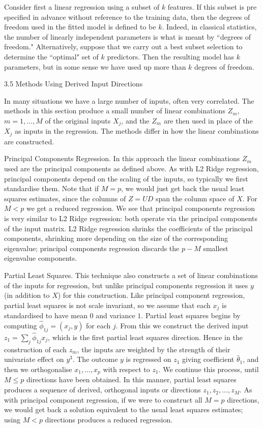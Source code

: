 Consider first a linear regression using a subset of $k$ features. If this subset is pre specified in advance without reference to the training data, then the degrees of freedom used in the fitted model is defined to be $k$. Indeed, in classical statistics, the number of linearly independent parameters is what is meant by ``degrees of freedom." Alternatively, suppose that we carry out a best subset selection to determine the ``optimal" set of $k$ predictors. Then the resulting model has $k$ parameters, but in some sense we have used up more than $k$ degrees of freedom.

3.5 Methods Using Derived Input Directions

In many situations we have a large number of inputs, often very correlated. The methods in this section produce a small number of linear combinations $Z_m$, $m = 1, \dots, M$ of the original inputs $X_j$, and the $Z_m$ are then used in place of the $X_j$ as inputs in the regression. The methods differ in how the linear combinations are constructed.

Principal Components Regression. In this approach the linear combinations $Z_m$ used are the principal components as defined above. As with L2 Ridge regression, principal components depend on the scaling of the inputs, so typically we first standardise them. Note that if $M = p$, we would just get back the usual least squares estimates, since the columns of $Z = UD$ span the column space of $X$. For $M < p$ we get a reduced regression. We see that principal components regression is very similar to L2 Ridge regression: both operate via the principal components of the input matrix. L2 Ridge regression shrinks the coefficients of the principal components, shrinking more depending on the size of the corresponding eigenvalue; principal components regression discards the $p - M$ smallest eigenvalue components.

Partial Least Squares. This technique also constructs a set of linear combinations of the inputs for regression, but unlike principal components regression it uses $y$ (in addition to $X$) for this construction. Like principal component regression, partial least squares is not scale invariant, so we assume that each $x_j$ is standardised to have mean $0$ and variance $1$. Partial least squares begins by computing $\hat{\phi}_{1j} = (x_j,y)$ for each $j$. From this we construct the derived input $z_1 = \sum_j \hat{\phi}_{1j} x_j$, which is the first partial least squares direction. Hence in the construction of each $z_m$, the inputs are weighted by the strength of their univariate effect on $y^3$. The outcome $y$ is regressed on $z_1$ giving coefficient $\hat{\theta}_1$, and then we orthogonalise $x_1, \dots, x_p$ with respect to $z_1$. We continue this process, until $M \le p$ directions have been obtained. In this manner, partial least squares produces a sequence of derived, orthogonal inputs or directions $z_1, z_2, \dots, z_M$. As with principal component regression, if we were to construct all $M = p$ directions, we would get back a solution equivalent to the usual least squares estimates; using $M < p$ directions produces a reduced regression.

